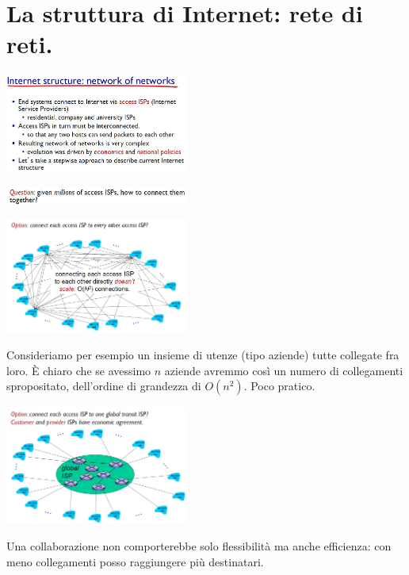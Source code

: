 \documentclass[10pt, a4paper, openany]{book}
\begin{document}
\section{La struttura di Internet: rete di reti.}
\begin{center}
    \includegraphics[width=60mm]{cap1 - Introduzione alle reti - 11.jpg}
\end{center}
\begin{center}
    \includegraphics[width=60mm]{cap1 - Introduzione alle reti - 12.jpg}
\end{center}
\begin{center}
    \includegraphics[width=60mm]{cap1 - Introduzione alle reti - 13.jpg}
\end{center}
\noindent Consideriamo per esempio un insieme di utenze (tipo aziende) tutte collegate fra loro. È chiaro che se avessimo $n$ aziende avremmo così un numero di collegamenti spropositato, dell'ordine di grandezza di $O(n^2)$. Poco pratico.
\begin{center}
    \includegraphics[width=60mm]{cap1 - Introduzione alle reti - 14.jpg}
\end{center}
\noindent Una collaborazione non comporterebbe solo flessibilità ma anche efficienza: con meno collegamenti posso raggiungere più destinatari.
\end{document}
